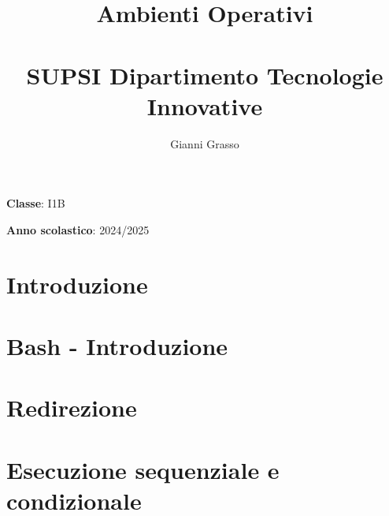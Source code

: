 \documentclass{article}
\title{
    Ambienti Operativi \\
    \phantom{}\\
    \large SUPSI Dipartimento Tecnologie Innovative
}
\author{Gianni Grasso}
\begin{document}
\maketitle
\hphantom{ }
\vspace{14.5cm}

\textbf{Classe}: I1B

\textbf{Anno scolastico}: 2024/2025
\pagebreak


\tableofcontents
\pagebreak

\section{Introduzione}

\pagebreak


\section{Bash - Introduzione}

\pagebreak

\section{Redirezione}

\pagebreak

\section{Esecuzione sequenziale e condizionale}

\pagebreak

\end{document}
